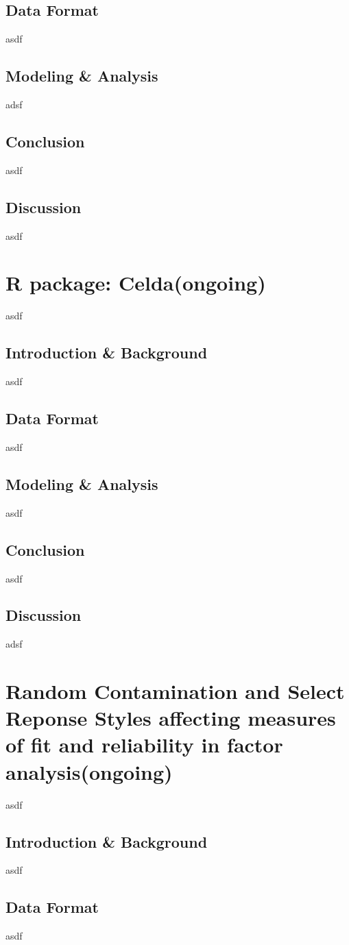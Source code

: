 \documentclass{article}
\begin{document}
	\subsection{Data Format}
	asdf
	\subsection{Modeling \& Analysis}
	adsf
	\subsection{Conclusion}
	asdf
	\subsection{Discussion}
	asdf

	\section{R package: Celda(ongoing)}
	asdf
	\subsection{Introduction \& Background}
	asdf
	\subsection{Data Format}
	asdf
	\subsection{Modeling \& Analysis}
	asdf
	\subsection{Conclusion}
	asdf
	\subsection{Discussion}
	adsf
	
	\section{Random Contamination and Select Reponse Styles affecting measures of fit and reliability in factor analysis(ongoing)}
	asdf
	\subsection{Introduction \& Background}
	asdf
	\subsection{Data Format}
	asdf
\end{document}
